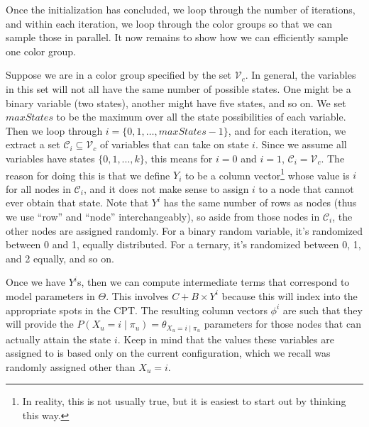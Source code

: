 \documentclass{article} %
\begin{document}
Once the initialization has concluded, we loop through the number of iterations, and within each
iteration, we loop through the color groups so that we can sample those in parallel. It now remains
to show how we can efficiently sample one color group.

Suppose we are in a color group specified by the set $\mathcal{V}_c$. In general, the variables in
this set will not all have the same number of possible states. One might be a binary variable (two
states), another might have five states, and so on. We set $maxStates$ to be the maximum over all
the state possibilities of each variable. Then we loop through $i = \{0, 1, \ldots, maxStates-1\}$,
and for each iteration, we extract a set $\mathcal{C}_i \subseteq \mathcal{V}_c$ of variables that
can take on state $i$. Since we assume all variables have states $\{0,1,...,k\}$, this means for
$i=0$ and $i=1$, $\mathcal{C}_i = \mathcal{V}_c$. The reason for doing this is that we define $Y_i$
to be a column vector\footnote{In reality, this is not usually true, but it is easiest to start out
by thinking this way.} whose value is $i$ for all nodes in $\mathcal{C}_i$, and it does not make
sense to assign $i$ to a node that cannot ever obtain that state. Note that $Y^i$ has the same
number of rows as nodes (thus we use ``row'' and ``node'' interchangeably), so aside from those
nodes in $\mathcal{C}_i$, the other nodes are assigned randomly.  For a binary random variable, it's
randomized between 0 and 1, equally distributed. For a ternary, it's randomized between 0, 1, and 2
equally, and so on.

Once we have $Y^i$s, then we can compute intermediate terms that correspond to model parameters in
$\Theta$. This involves $C + B\times Y^i$ because this will index into the appropriate spots in the
CPT. The resulting column vectors $\phi^i$ are such that they will provide the $P(X_u = i \mid
\pi_u) = \theta_{X_u = i \mid \pi_u}$ parameters for those nodes that can actually attain the state
$i$. Keep in mind that the values these variables are assigned to is based only on the current
configuration, which we recall was randomly assigned other than $X_u = i$.
\end{document}
